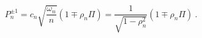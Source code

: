 \begin{equation}
\label{Pdef}
P_{n}^{\pm 1} = c_n \sqrt{\frac{\omega_n}{n}} ( 1 \mp \rho_n \Pi) =
\frac{1}{\sqrt{1-\rho^2_{n}}} (1  \mp \rho_{n} \Pi)~.
\end{equation}


